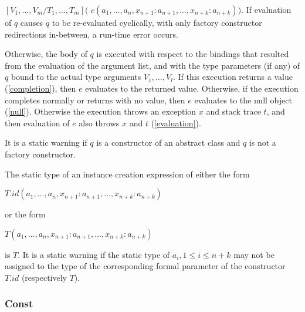 \documentclass{article}
\newcommand{\code}[1]{{\sf #1}}
\begin{document}
$[V_1,  \ldots, V_m/T_1,  \ldots, T_m]($\code{\NEW{} $c(a_1, \ldots, a_n, x_{n+1}: a_{n+1}, \ldots, x_{n+k}: a_{n+k}))$}.  If evaluation of $q$ causes $q$ to be re-evaluated cyclically, with only factory constructor redirections in-between, a run-time error occurs.


\LMHash{}
Otherwise, the body of $q$ is executed with respect to the bindings that resulted from the evaluation of the argument list, and with the type parameters (if any) of $q$ bound to the actual type arguments $V_1, \ldots, V_l$.
If this execution returns a value (\ref{completion}),
then $e$ evaluates to the returned value.
Otherwise, if the execution completes normally or returns with no value,
then $e$ evaluates to the null object (\ref{null}).
Otherwise the execution throws an exception $x$ and stack trace $t$,
and then evaluation of $e$ also throws $x$ and $t$ (\ref{evaluation}).

\LMHash{}
It is a static warning if $q$ is a constructor of an abstract class and $q$ is not a factory constructor.



\LMHash{}
The static type of an instance creation expression of either the form

\NEW{} $T.id(a_1, \ldots , a_n, x_{n+1}: a_{n+1}, \ldots , x_{n+k}: a_{n+k})$

or the form

\NEW{} $T(a_1, \ldots , a_n, x_{n+1}: a_{n+1}, \ldots , x_{n+k}: a_{n+k})$

is $T$.
It is a static warning if the static type of $a_i, 1 \le i \le n+ k$ may not be assigned to the type of the corresponding formal parameter of the constructor $T.id$ (respectively $T$).



\subsubsection{ Const}
\end{document}
